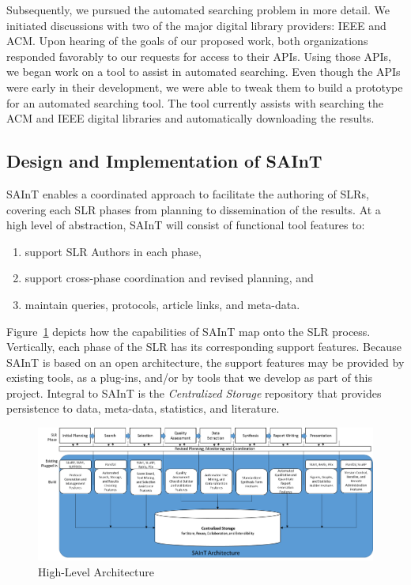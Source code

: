 Subsequently, we pursued the automated searching problem in more detail.
We initiated discussions with two of the major digital library providers: IEEE and ACM. 
Upon hearing of the goals of our proposed work, both organizations responded favorably to our requests for access to their APIs.
Using those APIs, we began work on a tool to assist in automated searching. 
Even though the APIs were early in their development, we were able to tweak them to build a prototype for an automated searching tool. 
The tool currently assists with searching the ACM and IEEE digital libraries and automatically downloading the results.

\subsection{Design and Implementation of SAInT}
\label{sec:design:implementation}

SAInT enables a coordinated approach to facilitate the authoring of SLRs, covering each SLR phases from planning to dissemination of the results. 
At a high level of abstraction, SAInT will consist of functional tool features to:
\begin{enumerate}
	\item support SLR Authors in each phase,
	\item support cross-phase coordination and revised planning, and 
	\item maintain queries, protocols, article links, and meta-data.
\end{enumerate}

Figure~\ref{fig-architecture} depicts how the capabilities of SAInT map onto the SLR process.   
Vertically, each phase of the SLR has its corresponding support features.
Because SAInT is based on an open architecture, the support features may be provided by existing tools, as a plug-ins, and/or by tools that we develop as part of this project. 
Integral to SAInT is the \textit{Centralized Storage} repository that provides persistence to data, meta-data, statistics, and literature.

\begin{figure}
	\centering
	\includegraphics[width=\textwidth]{Architecture}
	\caption{High-Level Architecture}
	\label{fig-architecture}
\end{figure}

